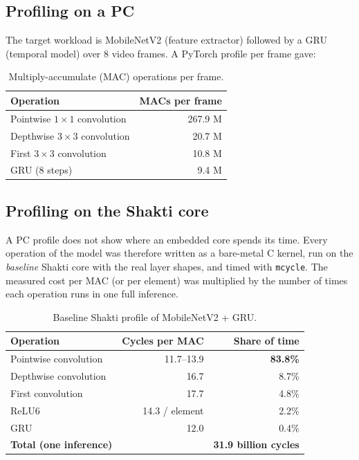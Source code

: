 \subsection{Profiling on a PC}

The target workload is MobileNetV2 (feature extractor) followed by a GRU
(temporal model) over 8 video frames. A PyTorch profile per frame gave:

\begin{table}[h]
\centering
\begin{tabular}{lr}\toprule
Operation & MACs per frame\\\midrule
Pointwise $1\times1$ convolution & 267.9 M\\
Depthwise $3\times3$ convolution & 20.7 M\\
First $3\times3$ convolution & 10.8 M\\
GRU (8 steps) & 9.4 M\\\bottomrule
\end{tabular}
\caption{Multiply-accumulate (MAC) operations per frame.}
\end{table}

\subsection{Profiling on the Shakti core}

A PC profile does not show where an embedded core spends its time. Every
operation of the model was therefore written as a bare-metal C kernel, run
on the \emph{baseline} Shakti core with the real layer shapes, and timed with
\texttt{mcycle}. The measured cost per MAC (or per element) was multiplied by
the number of times each operation runs in one full inference.

\begin{table}[h]
\centering
\begin{tabular}{lrr}\toprule
Operation & Cycles per MAC & Share of time\\\midrule
Pointwise convolution & 11.7--13.9 & \textbf{83.8\%}\\
Depthwise convolution & 16.7 & 8.7\%\\
First convolution & 17.7 & 4.8\%\\
ReLU6 & 14.3 / element & 2.2\%\\
GRU & 12.0 & 0.4\%\\\midrule
\textbf{Total (one inference)} & & \textbf{31.9 billion cycles}\\\bottomrule
\end{tabular}
\caption{Baseline Shakti profile of MobileNetV2 + GRU.}
\end{table}

